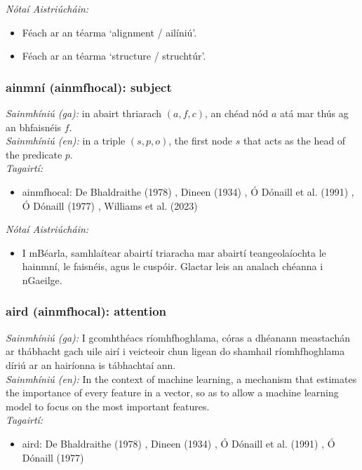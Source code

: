  \noindent \textit{Nótaí Aistriúcháin:}
\begin{itemize}
	\item Féach ar an téarma `alignment / ailíniú'.
	\item Féach ar an téarma `structure / struchtúr'.
\end{itemize}


\subsubsection*{ainmní (ainmfhocal): subject}
 \noindent \textit{Sainmhíniú (ga):} in abairt thriarach $(a,f,c)$, an chéad nód $a$ atá mar thús ag an bhfaisnéis $f$.
\\
 \noindent \textit{Sainmhíniú (en):} in a triple $(s,p,o)$, the first node $s$ that acts as the head of the predicate $p$.
\\
 \noindent \textit{Tagairtí:}
\begin{itemize}
	\item ainmfhocal: De Bhaldraithe (1978) \cite{de-bhaldraithe}, Dineen (1934) \cite{dineen}, Ó Dónaill et al. (1991) \cite{focloir-beag}, Ó Dónaill (1977) \cite{odonaill}, Williams et al. (2023) \cite{storchiste}
\end{itemize}

 \noindent \textit{Nótaí Aistriúcháin:}
\begin{itemize}
	\item I mBéarla, samhlaítear abairtí triaracha mar abairtí teangeolaíochta le hainmní, le faisnéis, agus le cuspóir. Glactar leis an analach chéanna i nGaeilge.
\end{itemize}


\subsubsection*{aird (ainmfhocal): attention}
 \noindent \textit{Sainmhíniú (ga):} I gcomhthéacs ríomhfhoghlama, córas a dhéanann meastachán ar thábhacht gach uile airí i veicteoir chun ligean do shamhail ríomhfhoghlama díriú ar an hairíonna is tábhachtaí ann.
\\
 \noindent \textit{Sainmhíniú (en):} In the context of machine learning, a mechanism that estimates the importance of every feature in a vector, so as to allow a machine learning model to focus on the most important features.
\\
 \noindent \textit{Tagairtí:}
\begin{itemize}
	\item aird: De Bhaldraithe (1978) \cite{de-bhaldraithe}, Dineen (1934) \cite{dineen}, Ó Dónaill et al. (1991) \cite{focloir-beag}, Ó Dónaill (1977) \cite{odonaill}
\end{itemize}

